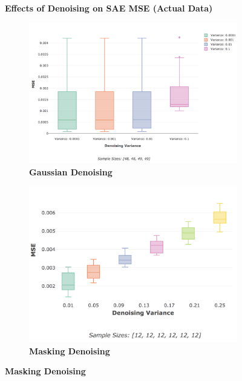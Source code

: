 \documentclass[a4paper,11pt,oneside]{article}
\theoremstyle{plain}
\theoremstyle{definition}
\begin{document}
	\begin{figure}[H]
		\centering
		\textbf{Effects of Denoising on SAE MSE (Actual Data)}
		\begin{subfigure}{.5\textwidth}
			\centering 
			\includegraphics[scale=0.25]{images/results/network/denoising/actual_mse_gaussian.png}
			\caption{\textbf{Gaussian Denoising} 
				\newline }
			\label{figure-actual_mse_gaussian}
		\end{subfigure}%
		\begin{subfigure}{.5\textwidth}
			\centering 
			\includegraphics[scale=0.25]{images/results/network/denoising/actual_mse_masking.png}
			\caption{\textbf{Masking Denoising} 
				\newline }
			\label{figure-actual_mse_masking}
		\end{subfigure}

\end{figure}
\end{document}

